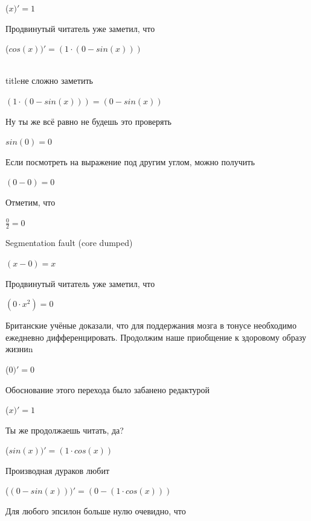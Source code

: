 \documentclass[12pt,a4paper,fleqn]{article}
\begin{document}
\begin{center}
\begin{center}
\begin{center}
\begin{center}
 ($x)'
  = 1$\end{center}
Продвинутый читатель уже заметил, что

\begin{center}
 ($cos(x))'
  = (1 \cdot (0-sin(x)))$\end{center}
\\ title{не сложно заметить} 

\begin{center}
$(1 \cdot (0-sin(x))) = (0-sin(x))$\end{center}
Ну ты же всё равно не будешь это проверять

\begin{center}
\begin{center}$sin(0) = 0$\end{center}
Если посмотреть на выражение под другим углом, можно получить

\begin{center}
\begin{center}$(0-0) = 0$\end{center}
Отметим, что

\begin{center}
\begin{center}$\frac{0}{2} = 0$\end{center}
Segmentation fault (core dumped)

\begin{center}
$(x-0) = x$\end{center}
Продвинутый читатель уже заметил, что

\begin{center}
$(0 \cdot x^{2}) = 0$\end{center}
Британские учёные доказали, что для поддержания мозга в тонусе необходимо ежедневно дифференцировать. Продолжим наше приобщение к здоровому образу жизниn

\begin{center}
 ($0)'
  = 0$\end{center}
Обоснование этого перехода было забанено редактурой

\begin{center}
 ($x)'
  = 1$\end{center}
Ты же продолжаешь читать, да?

\begin{center}
 ($sin(x))'
  = (1 \cdot cos(x))$\end{center}
Производная дураков любит\cite{link2}

\begin{center}
 ($(0-sin(x)))'
  = (0-(1 \cdot cos(x)))$\end{center}
Для любого эпсилон больше нулю очевидно, что


\end{center}
\end{center}
\end{center}
\end{center}
\end{center}
\end{center}
\end{document}
